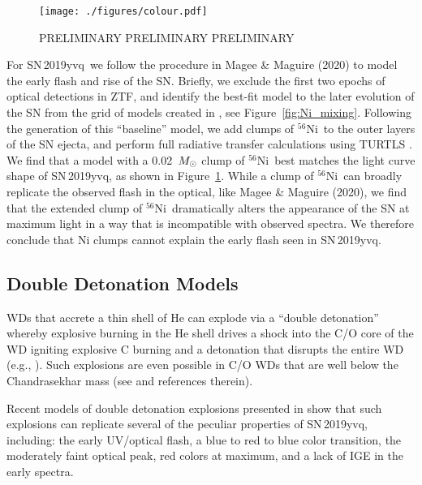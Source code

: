 \documentclass[twocolumn]{aastex63}
\newcommand{\radni}{$^{56}$Ni}
\newcommand{\sn}{SN\,2019yvq}
\begin{document}
\begin{figure}
    \centering
    \texttt{[image: ./figures/colour.pdf]}
    \caption{PRELIMINARY PRELIMINARY PRELIMINARY}
    \label{fig:Ni_bullet}
\end{figure}

For \sn\ we follow the procedure in Magee \& Maguire (2020) to model the early
flash and rise of the SN. Briefly, we exclude the first two epochs of optical
detections in ZTF, and identify the best-fit model to the later evolution of
the SN from the grid of models created in \citet{Magee20}, see
Figure~\ref{fig:Ni_mixing}. Following the generation of this ``baseline''
model, we add clumps of \radni\ to the outer layers of the SN ejecta, and
perform full radiative transfer calculations using TURTLS \citep{Magee18}. We
find that a model with a 0.02~$M_{\rm{\odot}}$ clump of \radni\ best matches
the light curve shape of \sn, as shown in Figure~\ref{fig:Ni_bullet}. While a
clump of \radni\ can broadly replicate the observed flash in the optical, like
Magee \& Maguire (2020), we find that the extended clump of \radni\
dramatically alters the appearance of the SN at maximum light in a way that is
incompatible with observed spectra. We therefore conclude that Ni clumps
cannot explain the early flash seen in \sn.

\subsection{Double Detonation Models}

WDs that accrete a thin shell of He can explode via a ``double detonation''
whereby explosive burning in the He shell drives a shock into the C/O core of
the WD igniting explosive C burning and a detonation that disrupts the entire
WD (e.g., \citealt{Nomoto82,Nomoto82a,Woosley94}). Such explosions are even
possible in C/O WDs that are well below the Chandrasekhar mass (see
\citealt{Fink07, Fink10} and references therein).

Recent models of double detonation explosions presented in \citet{Polin19}
show that such explosions can replicate several of the peculiar properties of
\sn, including: the early UV/optical flash, a blue to red to blue color
transition, the moderately faint optical peak, red colors at maximum, and a
lack of IGE in the early spectra.
\end{document}
